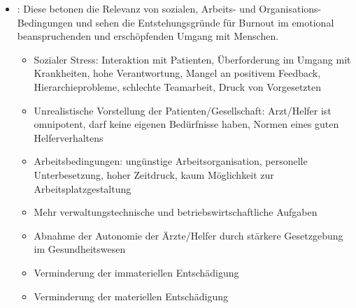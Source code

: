 {\begin{itemize}
  \begin{itemize}
    \item Perfektionismus, Zwanghaftigkeit
    \item Hohes Kontrollbedürfnis
    \item Übermäßiges Verantwortungsbewusstsein
    \item Hang zu übermäßigen und unrealistischen Schuldgefühlen
    \item Idealismus, Übereifer
    \item Verkopfung bzw. Unterdrückung von Gefühlen
    \item Wunsch alles selber zu machen bzw. kein Erbitten von Hilfe
    \item Schwierigkeit freie Zeit zu nehmen und zu genießen
  \end{itemize}
  \item {}: Diese betonen die
  Relevanz von sozialen, Arbeits- und
  Organisations-Bedingungen und sehen die Entstehungsgründe
  für Burnout im emotional beanspruchenden und
  erschöpfenden Umgang mit Menschen.
  \begin{itemize}
    \item Sozialer Stress: Interaktion mit Patienten,
    Überforderung im Umgang mit
    Krankheiten, hohe Verantwortung, Mangel an positivem
    Feedback, Hierarchieprobleme, schlechte Teamarbeit, Druck
    von Vorgesetzten
    \item Unrealistische Vorstellung der
    Patienten/Gesellschaft: Arzt/Helfer ist omnipotent, darf
    keine eigenen Bedürfnisse haben, Normen eines guten
    Helferverhaltens \item Arbeitsbedingungen: ungünstige
    Arbeitsorganisation, personelle Unterbesetzung, hoher
    Zeitdruck, kaum Möglichkeit zur Arbeitsplatzgestaltung
    \item Mehr verwaltungstechnische und
    betriebswirtschaftliche Aufgaben
    \item Abnahme der Autonomie der Ärzte/Helfer durch
    stärkere Gesetzgebung im Gesundheitswesen
    \item Verminderung der immateriellen Entschädigung
    \item Verminderung der materiellen Entschädigung
  \end{itemize}
\end{itemize}
}%




